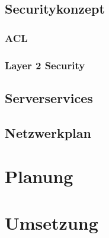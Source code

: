 \documentclass[12pt,a4paper,titlepage]{article}
\begin{document}
\subsection{Securitykonzept} 
\subsubsection{ACL}
\subsubsection{Layer 2 Security}
\subsection{Serverservices}
\subsection{Netzwerkplan}
\section{Planung}
\section{Umsetzung}
\end{document}
